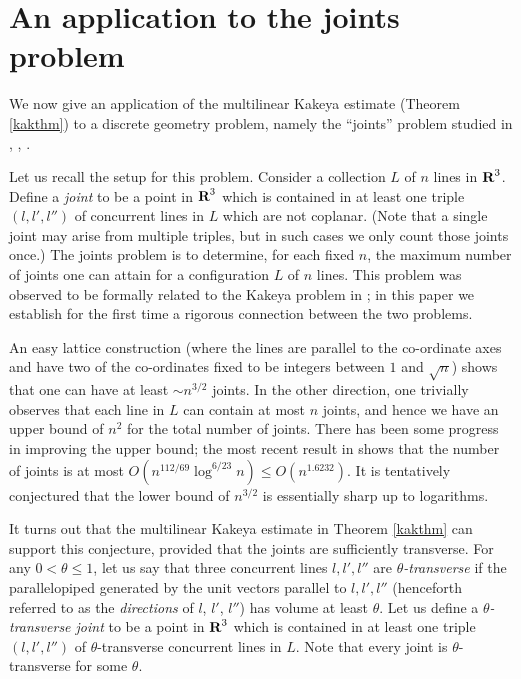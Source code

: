 \section{An application to the joints problem}\label{joints-sec}

We now give an application of the multilinear Kakeya estimate
(Theorem \ref{kakthm}) to a discrete geometry problem, namely the
``joints'' problem studied in \cite{chaz}, \cite{sharir},
\cite{feldman}.

Let us recall the setup for this problem.  Consider a collection
$L$ of $n$ lines in ${\hbox{\bf R}}^3$.  Define a \emph{joint} to be a point
in ${\hbox{\bf R}}^3$ which is contained in at least one triple $(l,l',l'')$
of concurrent lines in $L$ which are not coplanar.  (Note that a
single joint may arise from multiple triples, but in such cases we
only count those joints once.) The joints problem is to determine,
for each fixed $n$, the maximum number of joints one can attain
for a configuration $L$ of $n$ lines. This problem was observed to
be formally related to the Kakeya problem in \cite{wolff:survey};
in this paper we establish for the first time a rigorous
connection between the two problems.

An easy lattice construction (where the lines are parallel to the
co-ordinate axes and have two of the co-ordinates fixed to be
integers between $1$ and $\sqrt{n}$) shows that one can have at
least $\sim n^{3/2}$ joints.  In the other direction, one
trivially observes that each line in $L$ can contain at most $n$
joints, and hence we have an upper bound of $n^2$ for the total
number of joints.  There has been some progress in improving the
upper bound; the most recent result in \cite{chaz} shows that the
number of joints is at most $O( n^{112/69} \log^{6/23} n ) \leq O(
n^{1.6232} )$.  It is tentatively conjectured that the lower bound
of $n^{3/2}$ is essentially sharp up to logarithms.

It turns out that the multilinear Kakeya estimate in Theorem
\ref{kakthm} can support this conjecture, provided that the joints
are sufficiently transverse.  For any $0 < \theta \leq 1$, let us
say that three concurrent lines $l, l', l''$ are
\emph{$\theta$-transverse} if the parallelopiped generated by the
unit vectors parallel to $l, l', l''$ (henceforth referred to as the
\emph{directions} of $l$, $l'$, $l''$) has volume at least
$\theta$.  Let us define a \emph{$\theta$-transverse joint} to be
a point in ${\hbox{\bf R}}^3$ which is contained in at least one triple
$(l,l',l'')$ of $\theta$-transverse concurrent lines in $L$.  Note
that every joint is $\theta$-transverse for some $\theta$.

